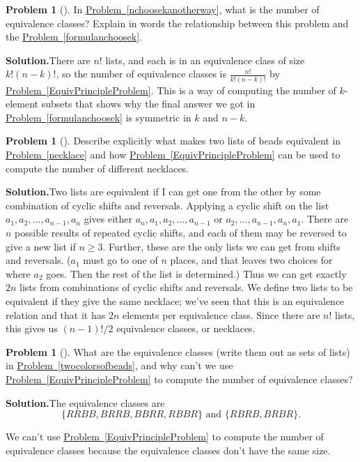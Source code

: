 \documentclass[10pt,]{book}
\theoremstyle{plain}
\theoremstyle{definition}
\newtheorem{activity}[project]{Problem}
\theoremstyle{definition}
\numberwithin{equation}{chapter}
\begin{document}
\begin{activity}[]\label{activity-357}
In \hyperref[nchoosekanotherway]{Problem~\ref{nchoosekanotherway}}, what is the number of equivalence classes? Explain in words the relationship between this problem and the \hyperref[formulanchoosek]{Problem~\ref{formulanchoosek}}.%
\par\medskip\noindent%
\textbf{Solution.}\quad There are \(n!\) lists, and each is in an equivalence class of size \(k!(n-k)!\), so the number of equivalence classes is \(\frac{n!}{k!(n-k)!}\) by \hyperref[EquivPrincipleProblem]{Problem~\ref{EquivPrincipleProblem}}. This is a way of computing the number of \(k\)-element subsets that shows why the final answer we got in \hyperref[formulanchoosek]{Problem~\ref{formulanchoosek}} is symmetric in \(k\) and \(n-k\).%
\end{activity}
\begin{activity}[]\label{activity-358}
Describe explicitly what makes two lists of beads equivalent in \hyperref[necklace]{Problem~\ref{necklace}} and how \hyperref[EquivPrincipleProblem]{Problem~\ref{EquivPrincipleProblem}} can be used to compute the number of different necklaces.%
\par\medskip\noindent%
\textbf{Solution.}\quad Two lists are equivalent if I can get one from the other by some combination of cyclic shifts and reversals. Applying a cyclic shift on the list \(a_1,a_2,\ldots,a_{n-1},a_n\) gives either \(a_n,a_1,a_2,\ldots ,a_{n-1}\) or \(a_2,\ldots,a_{n-1},a_n,a_1\). There are \(n\) possible results of repeated cyclic shifts, and each of them may be reversed to give a new list if \(n\ge 3\). Further, these are the only lists we can get from shifts and reversals. (\(a_1\) must go to one of \(n\) places, and that leaves two choices for where \(a_2\) goes. Then the rest of the list is determined.) Thus we can get exactly \(2n\) lists from combinations of cyclic shifts and reversals. We define two lists to be equivalent if they give the same necklace; we've seen that this is an equivalence relation and that it has \(2n\) elements per equivalence class. Since there are \(n!\) lists, this gives us \((n-1)!/2\) equivalence classes, or necklaces.%
\end{activity}
\begin{activity}[]\label{activity-359}
What are the equivalence classes (write them out as sets of lists) in \hyperref[twocolorsofbeads]{Problem~\ref{twocolorsofbeads}}, and why can't we use \hyperref[EquivPrincipleProblem]{Problem~\ref{EquivPrincipleProblem}} to compute the number of equivalence classes?%
\par\medskip\noindent%
\textbf{Solution.}\quad The equivalence classes are%
\begin{equation*}
\{RRBB, BRRB, BBRR, RBBR\}
\mbox{~and~}
\{RBRB, BRBR\}.
\end{equation*}
%
\par
We can't use \hyperref[EquivPrincipleProblem]{Problem~\ref{EquivPrincipleProblem}} to compute the number of equivalence classes because the equivalence classes don't have the same size.%
\end{activity}
\end{document}
